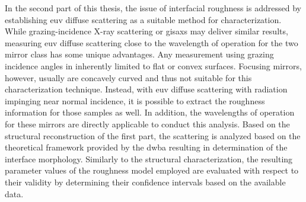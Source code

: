 In the second part of this thesis, the issue of interfacial roughness is addressed by establishing \gls{euv} diffuse scattering as a suitable method for characterization. While grazing-incidence X-ray scattering or \gls{gisaxs} may deliver similar results, measuring \gls{euv} diffuse scattering close to the wavelength of operation for the two mirror class has some unique advantages. Any measurement using grazing incidence angles in inherently limited to flat or convex surfaces. Focusing mirrors, however, usually are concavely curved and thus not suitable for this characterization technique. Instead, with \gls{euv} diffuse scattering with radiation impinging near normal incidence, it is possible to extract the roughness information for those samples as well. In addition, the wavelengths of operation for these mirrors are directly applicable to conduct this analysis. Based on the structural reconstruction of the first part, the scattering is analyzed based on the theoretical framework provided by the \gls{dwba} \cite{holy_nonspecular_1994, holy_x-ray_1993} resulting in determination of the interface morphology. Similarly to the structural characterization, the resulting parameter values of the roughness model employed are evaluated with respect to their validity by determining their confidence intervals based on the available data.

